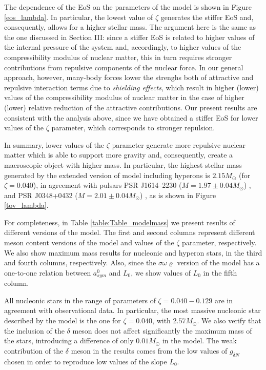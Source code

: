 \documentclass[twocolumn,showpacs,aps]{revtex4}
\begin{document}
 
The dependence of the EoS on the parameters of the model is shown in Figure \ref{eos_lambda}. 
In particular, the lowest value of $\zeta$ generates the stiffer 
EoS and, consequently, allows for a higher stellar mass. 
The argument here is the same as the one discussed in Section III: 
since a stiffer EoS is related to
higher values of the internal pressure of the system and,
accordingly, to higher values of 
the compressibility modulus of nuclear matter, this in turn requires stronger
contributions from repulsive components of 
the nuclear force. 
In our general approach, however,
many-body forces lower the strenghs both of attractive and
repulsive interaction terms due to {\it shielding effects}, which
result in higher (lower) values of the compressibility modulus
of nuclear matter in the case of higher (lower)
relative reduction of the attractive contributions. 
Our present results are consistent with the
analysis above, since we have obtained a stiffer EoS
for lower values of the 
$\zeta$ parameter, which corresponds to stronger repulsion. 

In summary, lower values of the $\zeta$ parameter
generate more repulsive nuclear matter which is able to support more gravity and, 
consequently, create a macroscopic object with higher mass. 
In particular, the highest stellar mass generated by the extended version of model including hyperons is $2.15 M_{\odot}$ (for $\zeta = 0.040$), 
in agreement with pulsars PSR J1614–2230 ($M = 1.97 \pm 0.04 M_\odot$) \cite{Demorest2010},
and PSR J0348+0432 ($M = 2.01 \pm 0.04 M_\odot$) \cite{Antoniadis2013}, as is shown in Figure \ref{tov_lambda}.

For completeness, in Table \ref{table:Table_modelmass} we present results of different versions of the model. 
The first and second columns represent different meson content versions of the model and values of the $\zeta$ parameter, respectively.
We also show maximum mass results for nucleonic and hyperon stars, in the third and fourth columns, respectively.
Also, since the $\sigma\omega\varrho$ version of the model has a one-to-one relation between 
$a_{sym}^0$ and $L_0$, we show values of $L_0$ in the fifth column.

All nucleonic stars in the range of parameters of $\zeta=0.040-0.129$ are in agreement with observational data.
In particular, the most massive nucleonic star described by the model is the one for $\zeta=0.040$, with $2.57M_{\odot}$.
We also verify that the inclusion of the $\delta$ meson does not affect significantly the maximum mass of the stars,
introducing a difference of only $0.01M_{\odot}$ in the model. The weak contribution of the $\delta$ meson in the 
results comes from the low values of $g_{\delta N}$ chosen in order to reproduce low values of the slope $L_0$.
\end{document}
